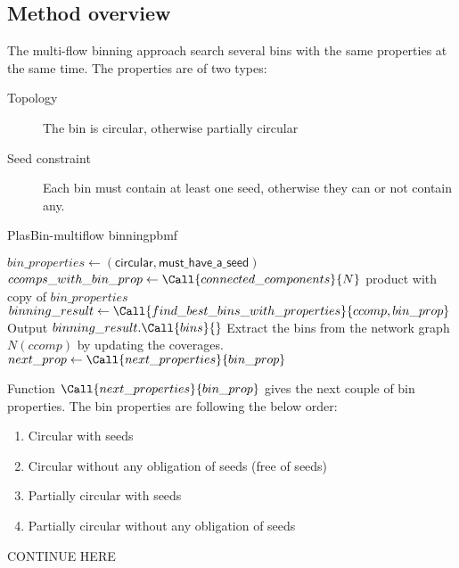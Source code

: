 \subsection{Method overview}

The multi-flow binning approach search several bins with the same properties at the same time.
The properties are of two types:
\begin{description}
  \item[Topology] The bin is circular, otherwise partially circular
  \item[Seed constraint] Each bin must contain at least one seed, otherwise they can or not contain any.
\end{description}

\begin{tcbalgo}{PlasBin-multiflow binning}{pbmf}
  \begin{algorithmic}[1]
    \State{} \( bin\_properties \gets (\mathsf{circular}, \mathsf{must\_have\_a\_seed}) \)
    \State{} \( ccomps\_with\_bin\_prop \gets \Call{connected\_components}{ N } \) product with copy of \( bin\_properties \)
    \State{} \( binning\_result \gets \Call{find\_best\_bins\_with\_properties}{ ccomp, bin\_prop } \)
    \State{} Output \( binning\_result.\Call{bins}{ } \)
    \State{} Extract the bins from the network graph \(N(ccomp)\) by updating the coverages.
    \State{} \( next\_prop \gets \Call{next\_properties}{ bin\_prop } \)
    \EndIf{}
    \EndIf{}
    \EndFor{}
    \EndFunction{}
  \end{algorithmic}
\end{tcbalgo}

Function \(\Call{next\_properties}{ bin\_prop }\) gives the next couple of bin properties.
The bin properties are following the below order:
\begin{enumerate}
  \item Circular with seeds
  \item Circular without any obligation of seeds (free of seeds)
  \item Partially circular with seeds
  \item Partially circular without any obligation of seeds
\end{enumerate}

\begin{todobox}
  CONTINUE HERE
\end{todobox}